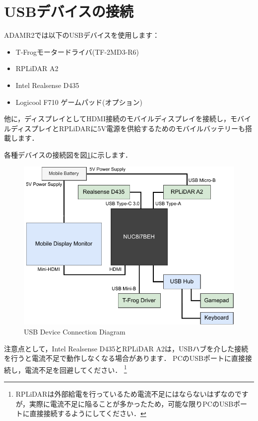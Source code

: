 \documentclass[{../../master}]{subfiles}
\begin{document}
\section{USBデバイスの接続}

ADAMR2では以下のUSBデバイスを使用します：

\begin{itemize}
  \item T-Frogモータードライバ(TF-2MD3-R6)
  \item RPLiDAR A2
  \item Intel Realsense D435
  \item Logicool F710 ゲームパッド(オプション)
\end{itemize}

他に，ディスプレイとしてHDMI接続のモバイルディスプレイを接続し，モバイルディスプレイとRPLiDARに5V電源を供給するためのモバイルバッテリーも搭載します．

各種デバイスの接続図を図\ref{fig:devices_connection}に示します．

\begin{figure}[ht]
  \centering
  \includegraphics[]{images/devices_connection.drawio.pdf}
  \caption{USB Device Connection Diagram}
  \label{fig:devices_connection}
\end{figure}

注意点として，Intel Realsense D435とRPLiDAR A2は，USBハブを介した接続を行うと電流不足で動作しなくなる場合があります．
PCのUSBポートに直接接続し，電流不足を回避してください．
\footnote{RPLiDARは外部給電を行っているため電流不足にはならないはずなのですが，実際に電流不足に陥ることが多かったため，可能な限りPCのUSBポートに直接接続するようにしてください．}
\end{document}
